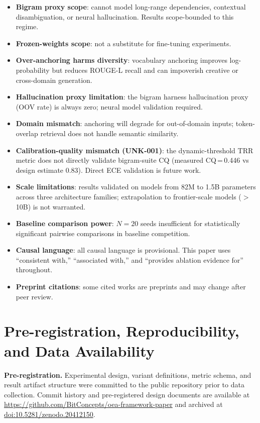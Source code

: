 \documentclass[11pt]{article}
\begin{document}
\begin{itemize}
  \item \textbf{Bigram proxy scope}: cannot model long-range dependencies, contextual disambiguation, or neural hallucination. Results scope-bounded to this regime.
  \item \textbf{Frozen-weights scope}: not a substitute for fine-tuning experiments.
  \item \textbf{Over-anchoring harms diversity}: vocabulary anchoring improves log-probability but reduces ROUGE-L recall and can impoverish creative or cross-domain generation.
  \item \textbf{Hallucination proxy limitation}: the bigram harness hallucination proxy (OOV rate) is always zero; neural model validation required.
  \item \textbf{Domain mismatch}: anchoring will degrade for out-of-domain inputs; token-overlap retrieval does not handle semantic similarity.
  \item \textbf{Calibration-quality mismatch (UNK-001)}: the dynamic-threshold TRR metric does not directly validate bigram-suite CQ (measured CQ\,=\,0.446 vs design estimate 0.83). Direct ECE validation is future work.
  \item \textbf{Scale limitations}: results validated on models from 82M to 1.5B parameters across three architecture families; extrapolation to frontier-scale models ($>$10B) is not warranted.
  \item \textbf{Baseline comparison power}: $N{=}20$ seeds insufficient for statistically significant pairwise comparisons in baseline competition.
  \item \textbf{Causal language}: all causal language is provisional. This paper uses ``consistent with,'' ``associated with,'' and ``provides ablation evidence for'' throughout.
  \item \textbf{Preprint citations}: some cited works are preprints and may change after peer review.
\end{itemize}

\section{Pre-registration, Reproducibility, and Data Availability}
\label{sec:reproducibility}

\textbf{Pre-registration.} Experimental design, variant definitions, metric schema, and result artifact structure were committed to the public repository prior to data collection. Commit history and pre-registered design documents are available at \url{https://github.com/BitConcepts/oea-framework-paper} and archived at \href{https://doi.org/10.5281/zenodo.20412150}{doi:10.5281/zenodo.20412150}.
\end{document}
